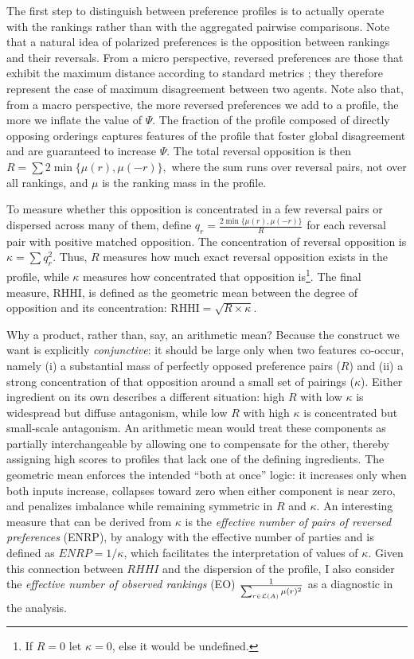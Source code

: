 \documentclass[12pt]{article}
\begin{document}
The first step to distinguish between preference profiles is to actually operate
with the rankings rather than with the aggregated pairwise comparisons. Note
that a natural idea of polarized preferences is the opposition between rankings
and their reversals. From a micro perspective, reversed preferences are those
that exhibit the maximum distance according to standard metrics \parencite{zwicker2016introduction}; they
therefore represent the case of maximum disagreement between two agents. Note
also that, from a macro perspective, the more reversed preferences we add to a
profile, the more we inflate the value of \(\Psi\). The fraction of the profile
composed of directly opposing orderings captures features of the profile that
foster global disagreement and are guaranteed to increase \(\Psi\). The total
reversal opposition is then \(R=\sum 2\min\{\mu(r),\mu(-r)\},\) where the sum
runs over reversal pairs, not over all rankings, and \(\mu\) is the ranking mass
in the profile.

To measure whether this opposition is concentrated in a few reversal pairs or
dispersed across many of them, define \(q_r=\frac{2\min\{\mu(r),\mu(-r)\}}{R}\)
for each reversal pair with positive matched opposition. The concentration of
reversal opposition is \(\kappa=\sum q_r^2.\) Thus, \(R\) measures how much
exact reversal opposition exists in the profile, while \(\kappa\) measures how
concentrated that opposition is\footnote{If \(R = 0\) let \(\kappa = 0\), else
  it would be undefined.}. The final measure, \( \mathrm{RHHI} \), is defined as
the geometric mean between the degree of opposition and its concentration:
\(\mathrm{RHHI} = \sqrt{R \times \kappa}.\)

Why a product, rather than, say, an arithmetic mean? Because the construct we
want is explicitly \emph{conjunctive}: it should be large only when two features
co-occur, namely (i) a substantial mass of perfectly opposed preference pairs
($R$) and (ii) a strong concentration of that opposition around a small set of
pairings ($\kappa$). Either ingredient on its own describes a different situation:
high $R$ with low $\kappa$ is widespread but diffuse antagonism, while low $R$ with
high $\kappa$ is concentrated but small-scale antagonism. An arithmetic mean would
treat these components as partially interchangeable by allowing one to
compensate for the other, thereby assigning high scores to profiles that lack
one of the defining ingredients. The geometric mean enforces the intended ``both
at once'' logic: it increases only when both inputs increase, collapses toward
zero when either component is near zero, and penalizes imbalance while remaining
symmetric in $R$ and $\kappa$. An interesting measure that can be derived from \(\kappa\)
is the \emph{effective number of pairs of reversed preferences} (ENRP), by analogy with
the effective number of parties \parencite{shugart2017votes} and is defined as \(ENRP = 1/\kappa\), which
facilitates the interpretation of values of \(\kappa\). Given this connection between
\(RHHI\) and the dispersion of the profile, I also consider the \emph{effective number of observed rankings}
(EO) \({1 \over {\sum_{r \in \mathcal{L}(A)}\mu(r)^2}}\)  as a diagnostic in
the analysis.
\end{document}
